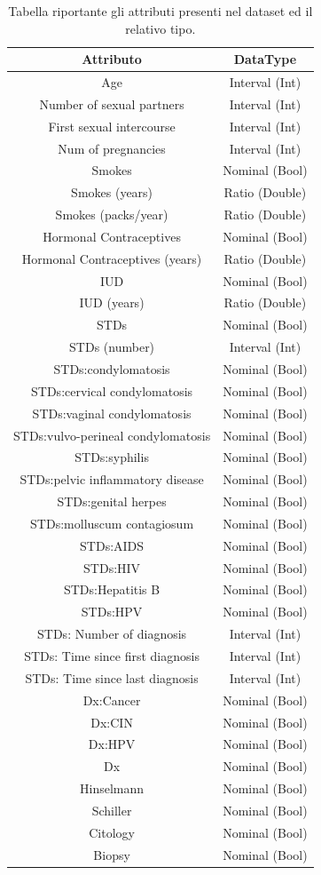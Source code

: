 \begin{table}
	\centering
	\caption{Tabella riportante gli attributi presenti nel dataset ed il relativo tipo.}
	\label{tab:attributes}
	\begin{tabular}{|c|c|}
		\toprule 
		Attributo & DataType \\ 
		\midrule 
		Age & Interval (Int) \\ 
		Number of sexual partners & Interval (Int) \\ 
		First sexual intercourse & Interval (Int) \\ 
		Num of pregnancies & Interval (Int) \\  
		Smokes & Nominal (Bool) \\  
		Smokes (years) & Ratio (Double) \\ 
		Smokes (packs/year) & Ratio (Double) \\ 
		Hormonal Contraceptives & Nominal (Bool) \\ 
		Hormonal Contraceptives (years) & Ratio (Double) \\ 
		IUD & Nominal (Bool) \\ 
		IUD (years) & Ratio (Double) \\ 
		STDs & Nominal (Bool) \\ 
		STDs (number) & Interval (Int) \\ 
		STDs:condylomatosis & Nominal (Bool) \\ 
		STDs:cervical condylomatosis & Nominal (Bool) \\ 
		STDs:vaginal condylomatosis & Nominal (Bool) \\ 
		STDs:vulvo-perineal condylomatosis & Nominal (Bool) \\ 
		STDs:syphilis & Nominal (Bool) \\ 
		STDs:pelvic inflammatory disease & Nominal (Bool) \\ 
		STDs:genital herpes & Nominal (Bool) \\ 
		STDs:molluscum contagiosum & Nominal (Bool) \\ 
		STDs:AIDS & Nominal (Bool) \\ 
		STDs:HIV & Nominal (Bool) \\ 
		STDs:Hepatitis B & Nominal (Bool) \\ 
		STDs:HPV & Nominal (Bool) \\ 
		STDs: Number of diagnosis & Interval (Int) \\  
		STDs: Time since first diagnosis & Interval (Int) \\ 
		STDs: Time since last diagnosis & Interval (Int) \\ 
		Dx:Cancer & Nominal (Bool) \\ 
		Dx:CIN & Nominal (Bool) \\ 
		Dx:HPV & Nominal (Bool) \\ 
		Dx & Nominal (Bool) \\ 
		Hinselmann & Nominal (Bool) \\ 
		Schiller & Nominal (Bool) \\  
		Citology & Nominal (Bool) \\ 
		Biopsy & Nominal (Bool) \\ 
		\bottomrule 
	\end{tabular} 
\end{table}


